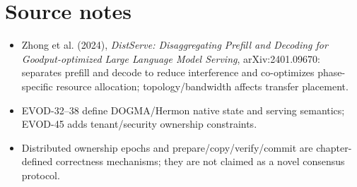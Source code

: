 \chapter*{Source notes}
\begin{itemize}
\item Zhong et al. (2024), \emph{DistServe: Disaggregating Prefill and Decoding for Goodput-optimized Large Language Model Serving}, arXiv:2401.09670: separates prefill and decode to reduce interference and co-optimizes phase-specific resource allocation; topology/bandwidth affects transfer placement.
\item EVOD-32--38 define DOGMA/Hermon native state and serving semantics; EVOD-45 adds tenant/security ownership constraints.
\item Distributed ownership epochs and prepare/copy/verify/commit are chapter-defined correctness mechanisms; they are not claimed as a novel consensus protocol.
\end{itemize}